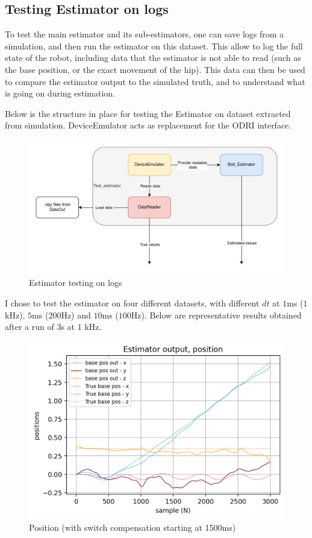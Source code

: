\documentclass[a4paper,10pt]{article}
\begin{document}
\subsection{Testing Estimator on logs}
To test the main estimator and its sub-estimators, one can save logs from a simulation, and then run the estimator on this dataset. This allow to log the full state of the robot, including data that the estimator is not able to read (such as the base position, or the exact movement of the hip). This data can then be used to compare the estimator output to the simulated truth, and to understand what is going on during estimation.

Below is the structure in place for testing the Estimator on dataset extracted from simulation. DeviceEmulator acts as replacement for the ODRI interface.
\begin{figure}[H]
\centering
  \includegraphics[width=\linewidth, angle=0, scale=1.1]{./images/Testing_estimator.png}
  \caption{Estimator testing on logs}
\end{figure}

I chose to test the estimator on four different datasets, with different $dt$ at $1$ms ($1$kHz), $5$ms ($200$Hz) and $10$ms ($100$Hz). Below are representative results obtained after a run of $3$s at $1$ kHz.

\begin{figure}[H]
\centering
  \includegraphics[width=\linewidth, angle=0, scale=0.8]{./images/resultat_simu_position.png}
  \caption{Position (with switch compensation starting at 1500ms)}
\end{figure}
\end{document}
